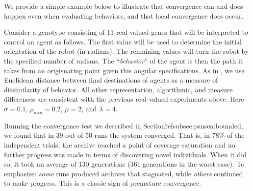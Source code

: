 \documentclass[twoside]{article}
\begin{document}
{%
%  
%
%
We provide a simple example below to illustrate that convergence can and does happen even when evaluating behaviors, and that local convergence does occur.

Consider a genotype consisting of 11 real-valued genes that will be interpreted to control an agent as follows.  The first value will be used to determine the initial orientation of the robot (in radians).  The remaining values will turn the robot by the specified number of radians.  The ``\emph{behavior}'' of the agent is then the path it takes from an origisnating point given this angular specifications.  As in \citep{LehmanStanley2008ssls}, we use Euclidean distance between final destinations of agents as a measure of dissimilarity of behavior.  All other representation, algorithmic, and measure differences are consistent with the previous real-valued experiments above.  Here $\sigma=0.1$, $\rho_{min} = 0.2$, $\mu=2$, and $\lambda=4$.

Running the convergence test we described in Section\~ref{subsec:psnsea:bounded}, we found that in 39 out of 50 runs the system converged.  That is, in 78\% of the independent trials, the archive reached a point of coverage saturation and no further progress was made in terms of discovering novel individuals.  When it did so, it took an average of 130 generations (361 generations in the worst case).  To emphasize:  \emph{some} runs produced archives that stagnated, while \emph{others} continued to make progress.  This is a classic sign of premature convergence.

}
\end{document}
